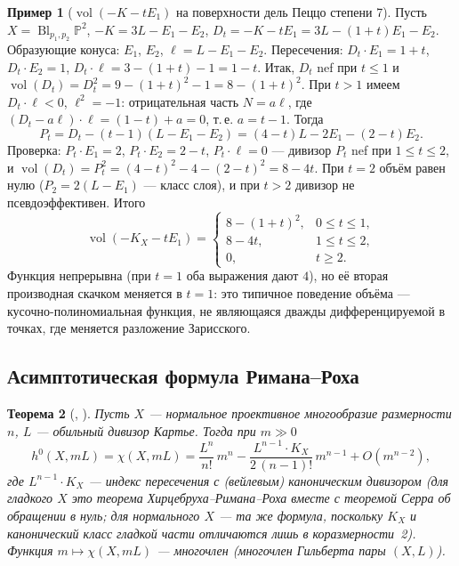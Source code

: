 \documentclass[11pt,a4paper]{article}
\theoremstyle{plain}
\newtheorem{theorem}{Теорема}[section]
\theoremstyle{definition}
\newtheorem{example}[theorem]{Пример}
\theoremstyle{remark}
\newcommand{\PP}{\mathbb{P}}
\DeclareMathOperator{\Bl}{Bl}
\DeclareMathOperator{\vol}{vol}
\begin{document}
\begin{example}[$\vol(-K-tE_1)$ на поверхности дель Пеццо степени 7]\label{ex:vol-dP7}
Пусть $X=\Bl_{p_1,p_2}\PP^2$, $-K=3L-E_1-E_2$, $D_t=-K-tE_1=3L-(1+t)E_1-E_2$. Образующие конуса:
$E_1$, $E_2$, $\ell=L-E_1-E_2$. Пересечения: $D_t\cdot E_1=1+t$, $D_t\cdot E_2=1$,
$D_t\cdot\ell=3-(1+t)-1=1-t$. Итак, $D_t$ nef при $t\le1$ и $\vol(D_t)=D_t^2=9-(1+t)^2-1=8-(1+t)^2$.
При $t>1$ имеем $D_t\cdot\ell<0$, $\ell^2=-1$: отрицательная часть $N=a\ell$, где
$(D_t-a\ell)\cdot\ell=(1-t)+a=0$, т.\,е. $a=t-1$. Тогда
\[
P_t=D_t-(t-1)(L-E_1-E_2)=(4-t)L-2E_1-(2-t)E_2 .
\]
Проверка: $P_t\cdot E_1=2$, $P_t\cdot E_2=2-t$, $P_t\cdot\ell=0$ --- дивизор $P_t$ nef при
$1\le t\le2$, и $\vol(D_t)=P_t^2=(4-t)^2-4-(2-t)^2=8-4t$. При $t=2$ объём равен нулю
($P_2=2(L-E_1)$ --- класс слоя), и при $t>2$ дивизор не псевдоэффективен. Итого
\[
\vol(-K_X-tE_1)=\begin{cases}8-(1+t)^2,&0\le t\le1,\\8-4t,&1\le t\le2,\\0,&t\ge2.\end{cases}
\]
Функция непрерывна (при $t=1$ оба выражения дают $4$), но её вторая производная скачком меняется в
$t=1$: это типичное поведение объёма --- кусочно-полиномиальная функция, не являющаяся дважды дифференцируемой в точках, где
меняется разложение Зарисского.
\end{example}

\subsection{Асимптотическая формула Римана--Роха}

\begin{theorem}[{\cite[1.1.24]{La}, \cite[2.1.2]{Xu}}]\label{thm:aRR}
Пусть $X$ --- нормальное проективное многообразие размерности $n$, $L$ --- обильный дивизор
Картье. Тогда при $m\gg0$
\[
h^0(X,mL)=\chi(X,mL)=\frac{L^n}{n!}\,m^n-\frac{L^{n-1}\cdot K_X}{2\,(n-1)!}\,m^{n-1}+O(m^{n-2}),
\]
где $L^{n-1}\cdot K_X$ --- индекс пересечения с \textup{(}вейлевым\textup{)} каноническим дивизором
\textup{(}для гладкого $X$ это теорема Хирцебруха--Римана--Роха вместе с теоремой Серра об обращении в нуль;
для нормального $X$ --- та же формула, поскольку $K_X$ и канонический класс гладкой части
отличаются лишь в коразмерности~2\textup{)}. Функция $m\mapsto\chi(X,mL)$ --- многочлен
\textup{(}\emph{многочлен Гильберта} пары $(X,L)$\textup{)}.
\end{theorem}
\end{document}
